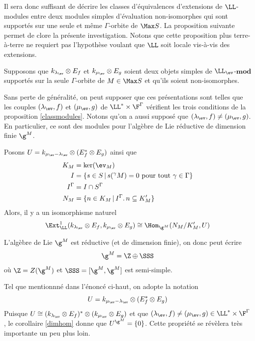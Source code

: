 Il sera donc suffisant de décrire les classes d'équivalences d'extensions de $\LL$-modules entre deux modules simples d'évaluation non-isomorphes qui sont supportés sur une seule et même $\Gamma$-orbite de $\Max S$. La proposition suivante permet de clore la présente investigation. Notons que cette proposition plus terre-à-terre ne requiert pas l'hypothèse voulant que $\LL$ soit locale vis-à-vis des extensions.

\begin{Prop} \label{madeuxiemepropyo} Supposons que $k_{\lambda_{\ev}} \otimes E_f$ et $k_{\mu_{\ev}} \otimes E_g$ soient deux objets simples de \linebreak $\LL_{\ev}$-$\mathbf{mod}$ supportés sur la seule $\Gamma$-orbite de $M \in \Max S$ et qu'ils soient non-isomorphes. 

Sans perte de généralité, on peut supposer que ces présentations sont telles que les couples $(\lambda_{\ev},f)$ et $(\mu_{\ev},g)$  de $\LL^* \times \F^\Gamma$ vérifient les trois conditions de la proposition \ref{classmodules}. Notons qu'on a aussi supposé que $(\lambda_{\ev},f) \neq (\mu_{\ev},g)$. En particulier, ce sont des modules pour l'algèbre de Lie réductive de dimension finie $\g^M$. 

Posons $U = k_{\mu_{\ev} - \lambda_{\ev}} \otimes (E_f^* \otimes E_g)$ ainsi que
\begin{align*}
K_M &= \ker (\ev_M) \\
I &= \{s \in S \, | \, s(^\gamma M) = 0 \text{ pour tout } \gamma \in \Gamma\} \\
I^\Gamma &= I \cap S^\Gamma \\
N_M &= \{n \in K_M \, | \, I^\Gamma.\,n \subseteq K_M'\} 
\end{align*}
Alors, il y a un isomorphisme naturel
$$ \Ext_\LL^1(k_{\lambda_{\ev}} \otimes E_f,k_{\mu_{\ev}} \otimes E_g) \cong \Hom_{\g^M}(N_M/K_M',U) $$
\begin{pre} L'algèbre de Lie $\g^M$ est réductive (et de dimension finie), on donc peut écrire
$$ \g^M = \Z \oplus \SSS $$
où $\Z = Z(\g^M)$ et $\SSS = [\g^M,\g^M]$ est semi-simple.

Tel que mentionnné dans l'énoncé ci-haut, on adopte la notation
\begin{equation} \label{ecriturespdgyo}
U = k_{\mu_{\ev} - \lambda_{\ev}} \otimes (E_f^* \otimes E_g)
\end{equation}
Puisque $U \cong (k_{\lambda_{\ev}} \otimes E_f)^* \otimes (k_{\mu_{\ev}} \otimes E_g)$ et que $(\lambda_{\ev},f) \neq (\mu_{\ev},g) \in \LL^* \times \F^\Gamma$, le corollaire \ref{dimhom} donne que $U^{\g^M} = \{0\}$. Cette propriété se révèlera très importante un peu plus loin.


\end{pre}
\end{Prop}
